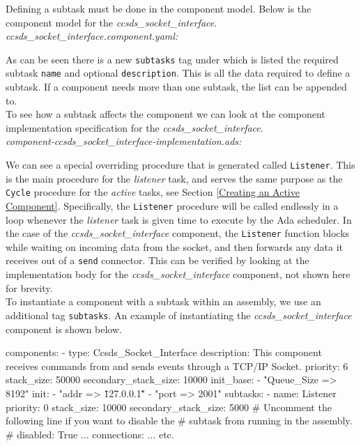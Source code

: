 Defining a subtask must be done in the component model. Below is the component model for the \textit{ccsds\_socket\_interface}. \\

\textit{ccsds\_socket\_interface.component.yaml:} 

As can be seen there is a new \texttt{subtasks} tag under which is listed the required subtask \texttt{name} and optional \texttt{description}. This is all the data required to define a subtask. If a component needs more than one subtask, the list can be appended to. \\

To see how a subtask affects the component we can look at the component implementation specification for the \textit{ccsds\_socket\_interface}. \\

\textit{component-ccsds\_socket\_interface-implementation.ads:} 

We can see a special overriding procedure that is generated called \texttt{Listener}. This is the main procedure for the \textit{listener} task, and serves the same purpose as the \texttt{Cycle} procedure for the \textit{active} tasks, see Section \ref{Creating an Active Component}. Specifically, the \texttt{Listener} procedure will be called endlessly in a loop whenever the \textit{listener} task is given time to execute by the Ada scheduler. In the case of the \textit{ccsds\_socket\_interface} component, the \texttt{Listener} function blocks while waiting on incoming data from the socket, and then forwards any data it receives out of a \texttt{send} connector. This can be verified by looking at the implementation body for the \textit{ccsds\_socket\_interface} component, not shown here for brevity. \\

To instantiate a component with a subtask within an assembly, we use an additional tag \texttt{subtasks}. An example of instantiating the \textit{ccsds\_socket\_interface} component is shown below.

\vspace{5mm} %
\begin{yamlcode}
components:
  - type: Ccsds_Socket_Interface
    description: This component receives commands from and sends events through a TCP/IP Socket.
    priority: 6
    stack_size: 50000
    secondary_stack_size: 10000
    init_base:
      - "Queue_Size => 8192"
    init:
      - "addr => \"127.0.0.1\""
      - "port => 2001"
    subtasks:
      - name: Listener
        priority: 0
        stack_size: 10000
        secondary_stack_size: 5000
        # Uncomment the following line if you want to disable the
        # subtask from running in the assembly.
        # disabled: True   
  ... 
connections: 
  ...
  etc.
\end{yamlcode}
\vspace{5mm} %

